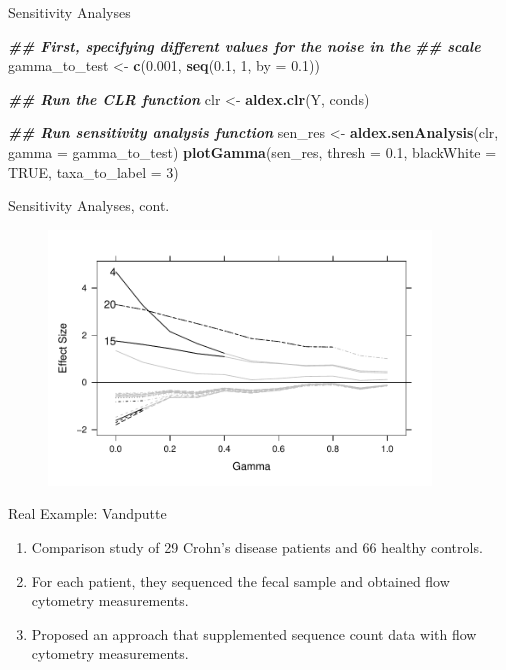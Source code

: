 \documentclass[
  ignorenonframetext,
]{beamer}
\newenvironment{Shaded}{\begin{snugshade}}{\end{snugshade}}
\newcommand{\AttributeTok}[1]{\textcolor[rgb]{0.13,0.29,0.53}{#1}}
\newcommand{\ConstantTok}[1]{\textcolor[rgb]{0.56,0.35,0.01}{#1}}
\newcommand{\DecValTok}[1]{\textcolor[rgb]{0.00,0.00,0.81}{#1}}
\newcommand{\DocumentationTok}[1]{\textcolor[rgb]{0.56,0.35,0.01}{\textbf{\textit{#1}}}}
\newcommand{\FloatTok}[1]{\textcolor[rgb]{0.00,0.00,0.81}{#1}}
\newcommand{\FunctionTok}[1]{\textcolor[rgb]{0.13,0.29,0.53}{\textbf{#1}}}
\newcommand{\NormalTok}[1]{#1}
\newcommand{\OtherTok}[1]{\textcolor[rgb]{0.56,0.35,0.01}{#1}}
\begin{document}
\begin{frame}[fragile]{Sensitivity Analyses}
\protect\hypertarget{sensitivity-analyses-2}{}
\begin{Shaded}
\begin{Highlighting}[]
\DocumentationTok{\#\# First, specifying different values for the noise in the}
\DocumentationTok{\#\# scale}
\NormalTok{gamma\_to\_test }\OtherTok{\textless{}{-}} \FunctionTok{c}\NormalTok{(}\FloatTok{0.001}\NormalTok{, }\FunctionTok{seq}\NormalTok{(}\FloatTok{0.1}\NormalTok{, }\DecValTok{1}\NormalTok{, }\AttributeTok{by =} \FloatTok{0.1}\NormalTok{))}

\DocumentationTok{\#\# Run the CLR function}
\NormalTok{clr }\OtherTok{\textless{}{-}} \FunctionTok{aldex.clr}\NormalTok{(Y, conds)}

\DocumentationTok{\#\# Run sensitivity analysis function}
\NormalTok{sen\_res }\OtherTok{\textless{}{-}} \FunctionTok{aldex.senAnalysis}\NormalTok{(clr, }\AttributeTok{gamma =}\NormalTok{ gamma\_to\_test)}
\FunctionTok{plotGamma}\NormalTok{(sen\_res, }\AttributeTok{thresh =} \FloatTok{0.1}\NormalTok{, }\AttributeTok{blackWhite =} \ConstantTok{TRUE}\NormalTok{, }\AttributeTok{taxa\_to\_label =} \DecValTok{3}\NormalTok{)}
\end{Highlighting}
\end{Shaded}
\end{frame}

\begin{frame}{Sensitivity Analyses, cont.}
\protect\hypertarget{sensitivity-analyses-cont.}{}
\begin{figure}
  \centering
  \includegraphics[width=4in]{figures/sim_gamma.pdf}
\end{figure}
\end{frame}

\begin{frame}{Real Example: Vandputte}
\protect\hypertarget{real-example-vandputte}{}
\begin{enumerate}
\item
  Comparison study of 29 Crohn's disease patients and 66 healthy
  controls.
\item
  For each patient, they sequenced the fecal sample and obtained flow
  cytometry measurements.
\item
  Proposed an approach that supplemented sequence count data with flow
  cytometry measurements.
\end{enumerate}
\end{frame}
\end{document}
